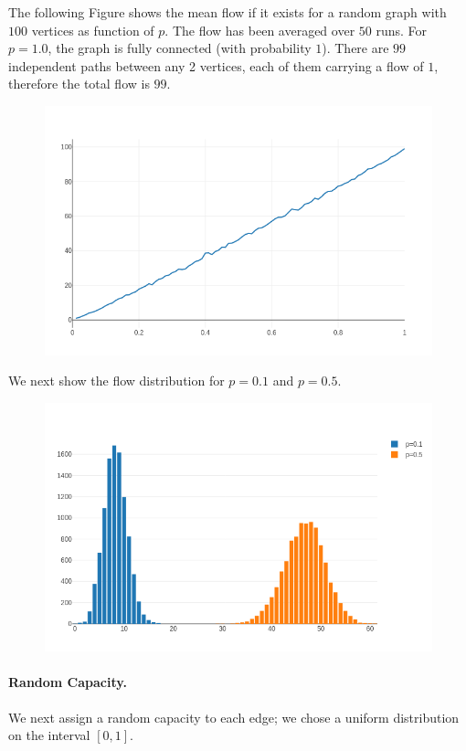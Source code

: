 The following Figure shows the mean flow if it exists for a random graph with $100$ vertices as function of $p$. The flow has been averaged over $50$ runs. For $p=1.0$, the graph is fully connected  (with probability $1$). There are $99$ independent paths between any 2 vertices, each of them carrying a flow of $1$, therefore the total flow is $99$. 

\begin{figure}[H]
\centering
\includegraphics[scale=0.45]{images/max_flow_04_04.png}
\end{figure}

We next show the flow distribution for $p=0.1$ and $p=0.5$.

\begin{figure}[H]
\centering
\includegraphics[scale=0.55]{images/max_flow_04_05.png}
\end{figure}

\paragraph{Random Capacity.} We next assign a random capacity to each edge; we chose a uniform distribution on the interval $[0,1]$. 

